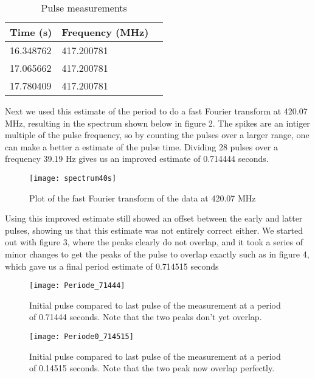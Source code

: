 \documentclass[twoside,twocolumn]{article}
\begin{document}
	
	\begin{table}[h]
		\caption{Pulse measurements}
		\centering
		\begin{tabular}{llr}
			\toprule
			\cmidrule(r){1-2}
			Time (s) & Frequency (MHz) \\
			\midrule
			16.348762 & 417.200781 \\
			17.065662 & 417.200781 \\
			17.780409 & 417.200781\\
			\bottomrule
		\end{tabular}
	\end{table}
	
	Next we used this estimate of the period to do a fast Fourier transform at 420.07 MHz, resulting in the spectrum shown below in figure 2. The spikes are an intiger multiple of the pulse frequency, so by counting the pulses over a larger range, one can make a better a estimate of the pulse time. Dividing 28 pulses over a frequency 39.19 Hz gives us an improved estimate of 0.714444 seconds. 
	
	\begin{figure}[h]
		\centering
		\texttt{[image: spectrum40s]}
		\caption{Plot of the fast Fourier transform of the data at 420.07 MHz}
		\label{Figure 2}
	\end{figure}

	Using this improved estimate still showed an offset between the early and latter pulses, showing us that this estimate was not entirely correct either. We started out with figure 3, where the peaks clearly do not overlap, and it took a series of minor changes to get the peaks of the pulse to overlap exactly such as in figure 4, which gave us a final period estimate of 0.714515 seconds
		\begin{figure}[h]
			\centering
			\texttt{[image: Periode\_71444]}
			\caption{Initial pulse compared to last pulse of the measurement at a period of 0.71444 seconds. Note that the two peaks don't yet overlap.}
			\label{Figure 3}
		\end{figure}
		
		\begin{figure}[h]
			\centering
			\texttt{[image: Periode0\_714515]}
			\caption{Initial pulse compared to last pulse of the measurement at a period of 0.14515 seconds. Note that the two peak now overlap perfectly.}
			\label{Figure 4}
		\end{figure}
	\newpage
\end{document}
